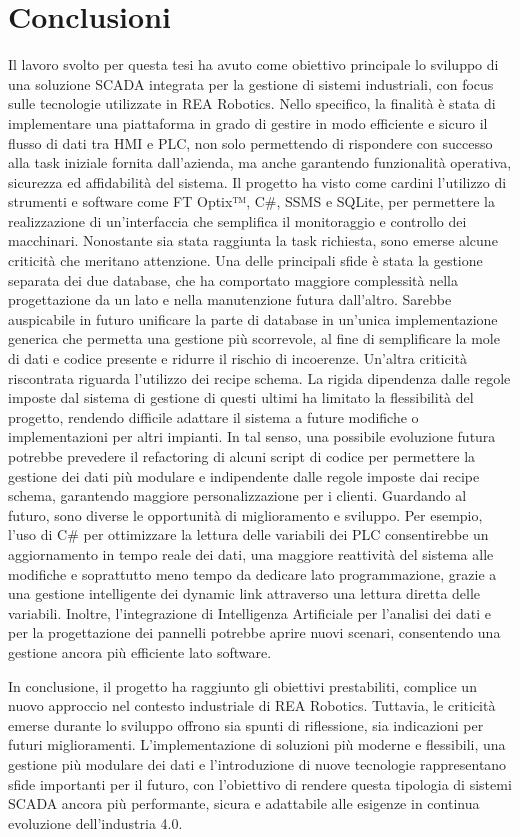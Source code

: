 \chapter{Conclusioni}

Il lavoro svolto per questa tesi ha avuto come obiettivo principale lo sviluppo di una soluzione SCADA integrata per la gestione di sistemi industriali, con focus sulle tecnologie utilizzate in REA Robotics. Nello specifico, la finalità è stata di implementare una piattaforma in grado di gestire in modo efficiente e sicuro il flusso di dati tra HMI e PLC, non solo permettendo di rispondere con successo alla task iniziale fornita dall'azienda, ma anche garantendo funzionalità operativa, sicurezza ed affidabilità del sistema. Il progetto ha visto come cardini l'utilizzo di strumenti e software come FT Optix™, C\#, SSMS e SQLite, per permettere la realizzazione di un'interfaccia che semplifica il monitoraggio e controllo dei macchinari. Nonostante sia stata raggiunta la task richiesta, sono emerse alcune criticità che meritano attenzione. Una delle principali sfide è stata la gestione separata dei due database, che ha comportato maggiore complessità nella progettazione da un lato e nella manutenzione futura dall'altro. Sarebbe auspicabile in futuro unificare la parte di database in un'unica implementazione generica che permetta una gestione più scorrevole, al fine di semplificare la mole di dati e codice presente e ridurre il rischio di incoerenze. Un'altra criticità riscontrata riguarda l'utilizzo dei recipe schema. La rigida dipendenza dalle regole imposte dal sistema di gestione di questi ultimi ha limitato la flessibilità del progetto, rendendo difficile adattare il sistema a future modifiche o implementazioni per altri impianti. In tal senso, una possibile evoluzione futura potrebbe prevedere il refactoring di alcuni script di codice per permettere la gestione dei dati più modulare e indipendente dalle regole imposte dai recipe schema, garantendo maggiore personalizzazione per i clienti. Guardando al futuro, sono diverse le opportunità di miglioramento e sviluppo. Per esempio, l'uso di C\# per ottimizzare la lettura delle variabili dei PLC consentirebbe un aggiornamento in tempo reale dei dati, una maggiore reattività del sistema alle modifiche e soprattutto meno tempo da dedicare lato programmazione, grazie a una gestione intelligente dei dynamic link attraverso una lettura diretta delle variabili. Inoltre, l'integrazione di Intelligenza Artificiale per l'analisi dei dati e per la progettazione dei pannelli potrebbe aprire nuovi scenari, consentendo una gestione ancora più efficiente lato software.

In conclusione, il progetto ha raggiunto gli obiettivi prestabiliti, complice un nuovo approccio nel contesto industriale di REA Robotics. Tuttavia, le criticità emerse durante lo sviluppo offrono sia spunti di riflessione, sia indicazioni per futuri miglioramenti. L'implementazione di soluzioni più moderne e flessibili, una gestione più modulare dei dati e l'introduzione di nuove tecnologie rappresentano sfide importanti per il futuro, con l'obiettivo di rendere questa tipologia di sistemi SCADA ancora più performante, sicura e adattabile alle esigenze in continua evoluzione dell'industria 4.0.
